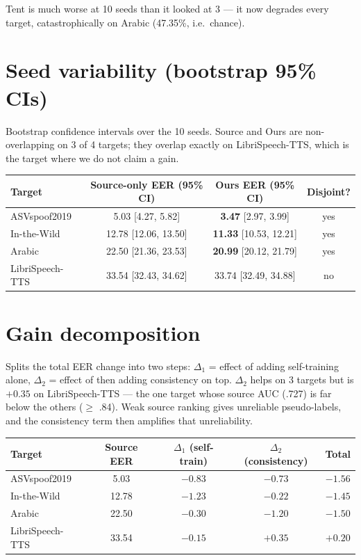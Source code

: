 \documentclass[11pt]{article}
\begin{document}
Tent is much worse at 10 seeds than it looked at 3 --- it now degrades every
target, catastrophically on Arabic (47.35\%, i.e.\ chance).

\section*{Seed variability (bootstrap 95\% CIs)}
Bootstrap confidence intervals over the 10 seeds. Source and Ours are
non-overlapping on 3 of 4 targets; they overlap exactly on LibriSpeech-TTS,
which is the target where we do not claim a gain.
\begin{table}[h]
\centering
\begin{tabular}{@{}lccc@{}}
\toprule
Target & Source-only EER (95\% CI) & Ours EER (95\% CI) & Disjoint? \\
\midrule
ASVspoof2019 & 5.03 [4.27, 5.82] & \textbf{3.47} [2.97, 3.99] & yes \\
In-the-Wild & 12.78 [12.06, 13.50] & \textbf{11.33} [10.53, 12.21] & yes \\
Arabic & 22.50 [21.36, 23.53] & \textbf{20.99} [20.12, 21.79] & yes \\
LibriSpeech-TTS & 33.54 [32.43, 34.62] & 33.74 [32.49, 34.88] & \cellcolor{red!10}no \\
\bottomrule
\end{tabular}
\end{table}

\newpage
\section*{Gain decomposition}
Splits the total EER change into two steps: $\Delta_1$ = effect of adding
self-training alone, $\Delta_2$ = effect of then adding consistency on top.
$\Delta_2$ helps on 3 targets but is $+0.35$ on LibriSpeech-TTS --- the one
target whose source AUC (.727) is far below the others ($\geq$ .84). Weak
source ranking gives unreliable pseudo-labels, and the consistency term then
amplifies that unreliability.
\begin{table}[h]
\centering
\begin{tabular}{@{}lcccc@{}}
\toprule
Target & Source EER & $\Delta_1$ (self-train) & $\Delta_2$ (consistency) & Total \\
\midrule
ASVspoof2019 & 5.03 & $-0.83$ & $-0.73$ & $-1.56$ \\
In-the-Wild & 12.78 & $-1.23$ & $-0.22$ & $-1.45$ \\
Arabic & 22.50 & $-0.30$ & $-1.20$ & $-1.50$ \\
LibriSpeech-TTS & 33.54 & $-0.15$ & \cellcolor{red!10}$+0.35$ & $+0.20$ \\
\bottomrule
\end{tabular}
\end{table}
\end{document}
